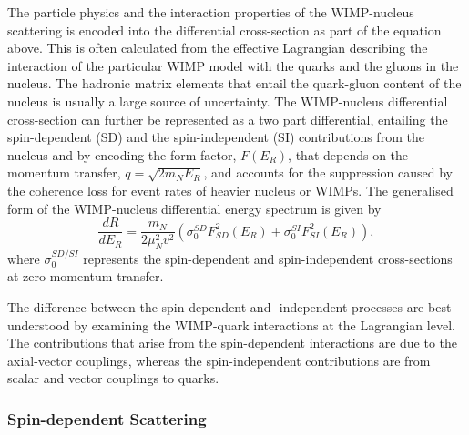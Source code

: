 The particle physics and the interaction properties of the WIMP-nucleus scattering is encoded into the differential cross-section as part of the equation above. This is often calculated from the effective Lagrangian describing the interaction of the particular WIMP model with the quarks and the gluons in the nucleus. The hadronic matrix elements that entail the quark-gluon content of the nucleus is usually a large source of uncertainty. The WIMP-nucleus differential cross-section can further be represented as a two part differential, entailing the spin-dependent (SD) and the spin-independent (SI) contributions from the nucleus and by encoding the form factor, $F(E_{R})$, that depends on the momentum transfer, $q=\sqrt{2m_{N}E_{R}}$, and accounts for the suppression caused by the coherence loss for event rates of heavier nucleus or WIMPs. The generalised form of the WIMP-nucleus differential energy spectrum is given by
%
\begin{equation} \label{eq:dependent_and_independent}
    \frac{dR}{dE_{R}} = \frac{m_{N}}{2\mu^{2}_{N}v^{2}} \left(\sigma_{0}^{SD}F^{2}_{SD}(E_{R}) + \sigma_{0}^{SI}F^{2}_{SI}(E_{R})\right),
\end{equation}
%
where $\sigma_{0}^{SD/SI}$ represents the spin-dependent and spin-independent cross-sections at zero momentum transfer.

The difference between the spin-dependent and -independent processes are best understood by examining the WIMP-quark interactions at the Lagrangian level. The contributions that arise from the spin-dependent interactions are due to the axial-vector couplings, whereas the spin-independent contributions are from scalar and vector couplings to quarks.

\subsubsection{Spin-dependent Scattering}
\label{subsec:SI_scatter}

